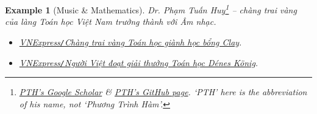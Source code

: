\documentclass[12pt]{article}
\newtheorem{example}{Example}
\begin{document}
\begin{example}[Music \& Mathematics]
	Dr. {\sc Phạm Tuấn Huy}\footnote{\href{https://scholar.google.com.vn/citations?hl=vi&user=MavyE28AAAAJ}{PTH's Google Scholar} \& \href{https://huytuanpham.github.io/}{PTH's GitHub page}. `PTH' here is the abbreviation of his name, not `Phương Trình Hàm'.} -- chàng trai vàng của làng Toán học Việt Nam trưởng thành với Âm nhạc.	
	\begin{itemize}
		\item \href{https://vnexpress.net/chang-trai-vang-toan-hoc-gianh-hoc-bong-clay-4564121.html}{VNExpress{\tt/}Chàng trai vàng Toán học giành học bổng Clay}.
		\item \href{https://vnexpress.net/nguoi-viet-doat-giai-thuong-toan-hoc-denes-k-nig-4742548.html}{VNExpress{\tt/}Người Việt đoạt giải thưởng Toán học Dénes König}.
	\end{itemize}
\end{example}

\end{document}
